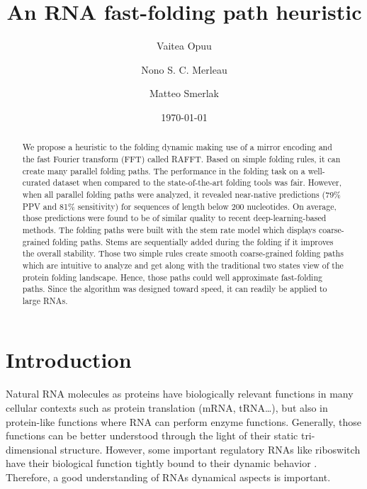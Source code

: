 \documentclass[a4paper,12pt]{article}
\author[]{Vaitea Opuu}
\author[]{Nono S. C. Merleau}
\author[]{Matteo Smerlak}
\affil[]{Max Planck Institute for Mathematics in the Sciences, D-04103 Leipzig, Germany}
\date{\today}
\title{An RNA fast-folding path heuristic}
\begin{document}
\maketitle
\begin{abstract}
We propose a heuristic to the folding dynamic making use of a mirror encoding
and the fast Fourier transform (FFT) called RAFFT. Based on simple folding
rules, it can create many parallel folding paths. The performance in the folding
task on a well-curated dataset when compared to the state-of-the-art folding
tools was fair. However, when all parallel folding paths were analyzed, it
revealed near-native predictions (79\% PPV and 81\% sensitivity) for sequences of
length below 200 nucleotides. On average, those predictions were found to be of
similar quality to recent deep-learning-based methods. The folding paths were
built with the stem rate model which displays coarse-grained folding paths.
Stems are sequentially added during the folding if it improves the overall
stability. Those two simple rules create smooth coarse-grained folding paths
which are intuitive to analyze and get along with the traditional two states
view of the protein folding landscape. Hence, those paths could well approximate
fast-folding paths. Since the algorithm was designed toward speed, it can
readily be applied to large RNAs.
\end{abstract}

\section{Introduction}
\label{sec:org42c9c3e}
Natural RNA molecules as proteins have biologically relevant functions in many
cellular contexts such as protein translation (mRNA, tRNA\ldots{}), but also in
protein-like functions where RNA can perform enzyme functions. Generally, those
functions can be better understood through the light of their static
tri-dimensional structure. However, some important regulatory RNAs like
riboswitch have their biological function tightly bound to their dynamic
behavior \cite{vitreschak04_ribos}. Therefore, a good understanding of RNAs
dynamical aspects is important.
\end{document}
